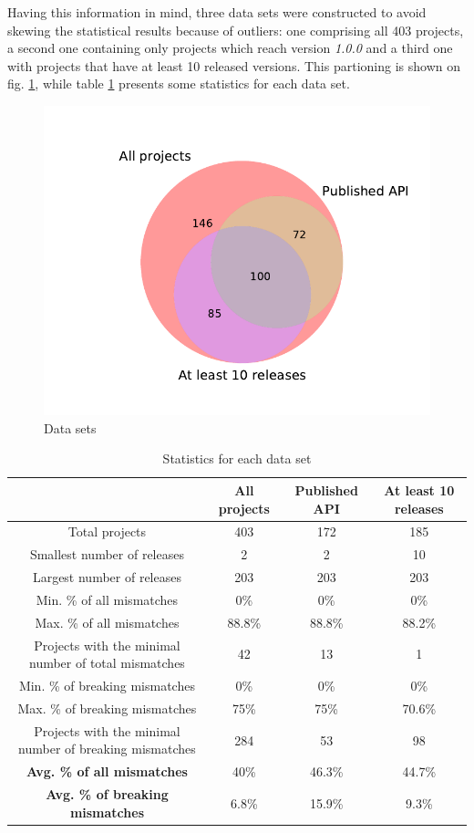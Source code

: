 \documentclass{l4proj}
\begin{document}
Having this information in mind, three data sets were constructed to
avoid skewing the statistical results because of outliers: one
comprising all 403 projects, a second one containing only projects
which reach version \textit{1.0.0} and a third one with projects that
have at least 10 released versions. This partioning is shown on fig.
\ref{Datasets}, while table \ref{DatasetStatistics} presents some
statistics for each data set.

\begin{figure}[H]
\centering
\includegraphics[height=0.3\textheight]{images/evaluation/datasets}
\caption{Data sets}
\label{Datasets}
\end{figure}

\begin{table}[H]
\centering
\begin{tabular}{|c|c|c|c|}
\hline
& \textbf{All projects} & \textbf{Published API} & \textbf{At least 10 releases} \\
\hline
Total projects & 403 & 172 & 185 \\
\hline
Smallest number of releases & 2 & 2 & 10 \\
\hline
Largest number of releases & 203 & 203 & 203 \\
\hline
Min. \% of all mismatches & 0\% & 0\% & 0\% \\
\hline
Max. \% of all mismatches & 88.8\% & 88.8\% & 88.2\% \\
\hline
Projects with the minimal number of total mismatches & 42 & 13 & 1 \\
\hline
Min. \% of breaking mismatches & 0\% & 0\% & 0\% \\
\hline
Max. \% of breaking mismatches & 75\% & 75\% & 70.6\% \\
\hline
Projects with the minimal number of breaking mismatches & 284 & 53 & 98 \\
\hline
\textbf{Avg. \% of all mismatches} & 40\% & 46.3\% & 44.7\% \\
\hline
\textbf{Avg. \% of breaking mismatches} & 6.8\% & 15.9\% & 9.3\% \\
\hline
\end{tabular}
\caption{Statistics for each data set}
\label{DatasetStatistics}
\end{table}
\end{document}
